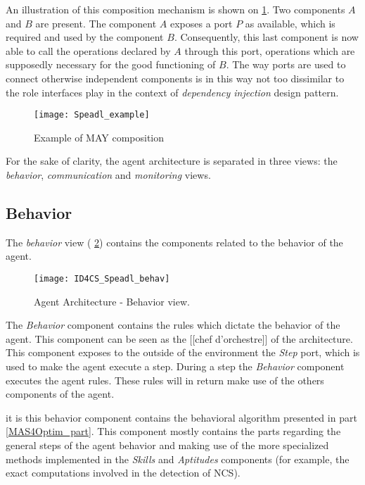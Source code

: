 An illustration of this composition mechanism is shown on \figurename{} \ref{Speadl_example}. Two components $A$ and $B$ are present. The component $A$ exposes a port $P$ as available, which is required and used by the component $B$. Consequently, this last component is now able to call the operations declared by $A$ through this port, operations which are supposedly necessary for the good functioning of $B$. The way ports are used to connect otherwise independent components is in this way not too dissimilar to the role interfaces play in the context of \emph{dependency injection} design pattern.

\begin{figure}
\centering
\texttt{[image: Speadl\_example]}
\caption{Example of MAY composition}\label{Speadl_example}
\end{figure}

For the sake of clarity, the agent architecture is separated in three views: the \emph{behavior}, \emph{communication} and \emph{monitoring} views.

\subsection{Behavior}

The \emph{behavior} view (\figurename{} \ref{Arch-behavior}) contains the components related to the behavior of the agent. 

\begin{figure}
\centering
\texttt{[image: ID4CS\_Speadl\_behav]}
\caption{Agent Architecture - Behavior view.}
\label{Arch-behavior}
\end{figure}

The \emph{Behavior} component contains the rules which dictate the behavior of the agent. This component can be seen as the [[chef d'orchestre]] of the architecture. This component exposes to the outside of the environment the \emph{Step} port, which is used to make the agent execute a step. During a step the \emph{Behavior} component executes the agent rules. These rules will in return make use of the others components of the agent.

it is this behavior component contains the behavioral algorithm presented in part \ref{MAS4Optim_part}. This component mostly contains the parts regarding the general steps of the agent behavior and making use of the more specialized methods  implemented in the \emph{Skills} and \emph{Aptitudes} components (for example, the exact computations involved in the detection of NCS).


